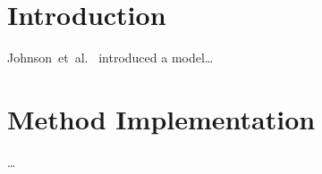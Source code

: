 \documentclass{article}
\begin{document}
{
    \section{Introduction}
    \label{sec:introduction}

    Johnson~et~al.~\cite{https://doi.org/10.48550/arxiv.1603.08155} introduced a model…





}

{
    \section{Method Implementation}
    \label{sec:method-implementation}

    …
}
\end{document}
